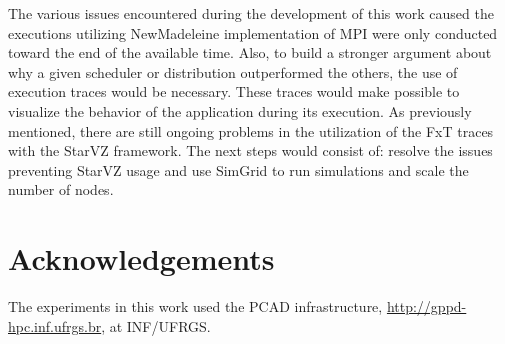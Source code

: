 \documentclass[conference, 10pt, final]{IEEEtran}
\begin{document}
The various issues encountered during the development of this work caused the executions utilizing NewMadeleine implementation of MPI were only conducted toward the end of the available time. Also, to build a stronger argument about why a given scheduler or distribution outperformed the others, the use of execution traces would be necessary. These traces would make possible to visualize the behavior of the application during its execution. As previously mentioned, there are still ongoing problems in the utilization of the FxT traces with the StarVZ framework. The next steps would consist of: resolve the issues preventing StarVZ usage and use SimGrid \cite{CASANOVA2025103125} to run simulations and scale the number of nodes.
\section*{Acknowledgements}

The experiments in this work used the PCAD infrastructure, \url{http://gppd-hpc.inf.ufrgs.br}, at INF/UFRGS.
\clearpage



\end{document}
